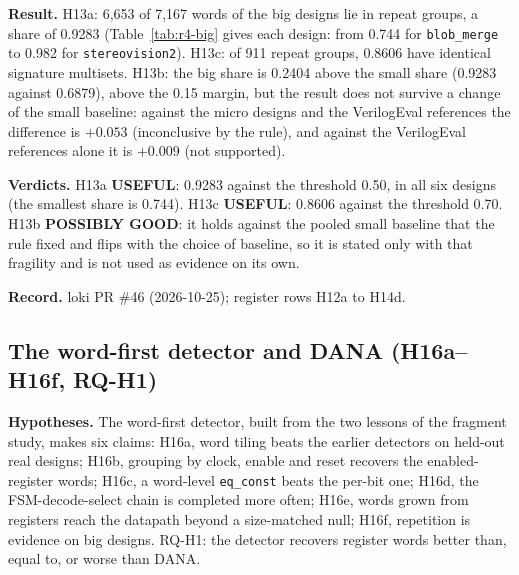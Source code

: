 \documentclass[conference]{IEEEtran}
\newcommand{\verdict}[1]{\textbf{\textsc{#1}}}
\newcommand{\hev}[1]{\par\smallskip\noindent\textbf{#1}}
\newcommand{\code}[1]{\texttt{#1}}
\begin{document}
\hev{Result.} H13a: 6{,}653 of 7{,}167 words of the big designs lie in repeat groups, a share of 0.9283 (Table~\ref{tab:r4-big}
gives each design: from 0.744 for \code{blob\_merge} to 0.982 for \code{stereovision2}). H13c: of 911 repeat groups,
0.8606 have identical signature multisets. H13b: the big share is 0.2404 above the small share (0.9283 against 0.6879), above
the 0.15 margin, but the result does not survive a change of the small baseline: against the micro designs and the
VerilogEval references the difference is $+0.053$ (inconclusive by the rule), and against the VerilogEval references alone it is
$+0.009$ (not supported).



\hev{Verdicts.} H13a \verdict{USEFUL}: 0.9283 against the threshold 0.50, in all six designs (the smallest share is 0.744).
H13c \verdict{USEFUL}: 0.8606 against the threshold 0.70. H13b \verdict{POSSIBLY GOOD}: it holds against the pooled small
baseline that the rule fixed and flips with the choice of baseline, so it is stated only with that fragility and is not used as
evidence on its own.


\hev{Record.} loki PR \#46 (2026-10-25); register rows H12a to H14d.

\subsection{The word-first detector and DANA (H16a--H16f, RQ-H1)}
\label{sec:round5}

\hev{Hypotheses.} The word-first detector, built from the two lessons of the fragment study, makes
six claims: H16a, word tiling beats the earlier detectors on held-out real designs; H16b, grouping by clock,
enable and reset recovers the enabled-register words; H16c, a word-level \code{eq\_const} beats the per-bit
one; H16d, the FSM-decode-select chain is completed more often; H16e, words grown from registers reach the
datapath beyond a size-matched null; H16f, repetition is evidence on big designs. RQ-H1: the detector recovers
register words better than, equal to, or worse than DANA.
\end{document}
